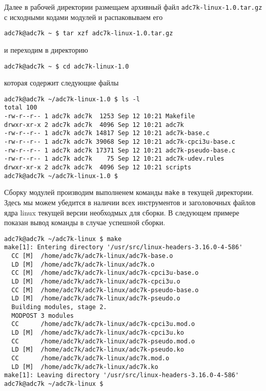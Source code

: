 \documentclass[a4paper]{article}
\begin{document}
Далее в рабочей директории размещаем архивный файл \mbox{\texttt{adc7k-linux-1.0.tar.gz}}
с исходными кодами модулей и распаковываем его
\begin{small}\begin{verbatim}
adc7k@adc7k ~ $ tar xzf adc7k-linux-1.0.tar.gz
\end{verbatim}\end{small}
и переходим в директорию
\begin{small}\begin{verbatim}
adc7k@adc7k ~ $ cd adc7k-linux-1.0
\end{verbatim}\end{small}
которая содержит следующие файлы
\begin{small}\begin{verbatim}
adc7k@adc7k ~/adc7k-linux-1.0 $ ls -l
total 100
-rw-r--r-- 1 adc7k adc7k  1253 Sep 12 10:21 Makefile
drwxr-xr-x 2 adc7k adc7k  4096 Sep 12 10:21 adc7k
-rw-r--r-- 1 adc7k adc7k 14817 Sep 12 10:21 adc7k-base.c
-rw-r--r-- 1 adc7k adc7k 39068 Sep 12 10:21 adc7k-cpci3u-base.c
-rw-r--r-- 1 adc7k adc7k 17371 Sep 12 10:21 adc7k-pseudo-base.c
-rw-r--r-- 1 adc7k adc7k    75 Sep 12 10:21 adc7k-udev.rules
drwxr-xr-x 2 adc7k adc7k  4096 Sep 12 10:21 scripts
adc7k@adc7k ~/adc7k-linux-1.0 $
\end{verbatim}\end{small}

Сборку модулей производим выполненем команды \texttt{make} в текущей директории.
Здесь мы можем убедится в наличии всех инструментов и заголовочных файлов ядра
linux текущей версии необходмых для сборки. В следующем примере показан вывод
команды в случае успешной сборки.
\begin{small}\begin{verbatim}
adc7k@adc7k ~/adc7k-linux $ make
make[1]: Entering directory '/usr/src/linux-headers-3.16.0-4-586'
  CC [M]  /home/adc7k/adc7k-linux/adc7k-base.o
  LD [M]  /home/adc7k/adc7k-linux/adc7k.o
  CC [M]  /home/adc7k/adc7k-linux/adc7k-cpci3u-base.o
  LD [M]  /home/adc7k/adc7k-linux/adc7k-cpci3u.o
  CC [M]  /home/adc7k/adc7k-linux/adc7k-pseudo-base.o
  LD [M]  /home/adc7k/adc7k-linux/adc7k-pseudo.o
  Building modules, stage 2.
  MODPOST 3 modules
  CC      /home/adc7k/adc7k-linux/adc7k-cpci3u.mod.o
  LD [M]  /home/adc7k/adc7k-linux/adc7k-cpci3u.ko
  CC      /home/adc7k/adc7k-linux/adc7k-pseudo.mod.o
  LD [M]  /home/adc7k/adc7k-linux/adc7k-pseudo.ko
  CC      /home/adc7k/adc7k-linux/adc7k.mod.o
  LD [M]  /home/adc7k/adc7k-linux/adc7k.ko
make[1]: Leaving directory '/usr/src/linux-headers-3.16.0-4-586'
adc7k@adc7k ~/adc7k-linux $
\end{verbatim}\end{small}
\end{document}
